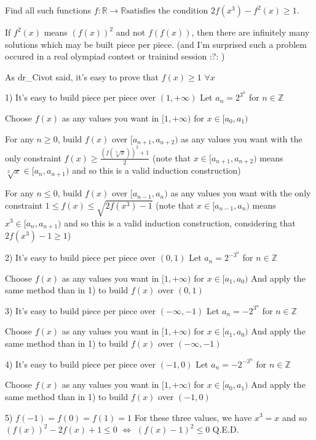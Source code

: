 \begin{solution}
	\begin{tcolorbox}Find all such functions $f:\mathbb{R} \to \mathbb{R} \text{satisfies the condition}$  $2f(x^3)-f^2(x)\geq 1$.\end{tcolorbox}
If $f^2(x)$ means $(f(x))^2$ and not $f(f(x))$, then there are infinitely many solutions which may be built piece per piece.
(and I'm surprised such a problem occured in a real olympiad contest or trainind session :?: )

As dr_Civot said, it's easy to prove that $f(x)\ge 1$ $\forall x$

1) It's easy to build piece per piece over $(1,+\infty)$
Let $a_n=2^{3^n}$ for $n\in\mathbb Z$

Choose $f(x)$ as any values you want in $[1,+\infty)$ for $x\in [a_0,a_1)$

For any $n\ge 0$, build $f(x)$ over $[a_{n+1},a_{n+2})$ as any values you want with the only constraint $f(x)\ge\frac{(f(\sqrt[3]x))^2+1}2$
(note that $x\in[a_{n+1},a_{n+2})$ means $\sqrt[3]x\in[a_{n},a_{n+1})$ and so this is a valid induction construction)

For any $n\le 0$, build $f(x)$ over $[a_{n-1},a_{n})$ as any values you want with the only constraint $1\le f(x)\le\sqrt{2f(x^3)-1}$
(note that $x\in[a_{n-1},a_{n})$ means $x^3\in[a_{n},a_{n+1})$ and so this is a valid induction construction, considering that $2f(x^3)-1\ge 1$)

2) It's easy to build piece per piece over $(0,1)$
Let $a_n=2^{-3^n}$ for $n\in\mathbb Z$

Choose $f(x)$ as any values you want in $[1,+\infty)$ for $x\in [a_1,a_0)$
And apply the same method than in 1) to build $f(x)$ over $(0,1)$

3) It's easy to build piece per piece over $(-\infty,-1)$
Let $a_n=-2^{3^n}$ for $n\in\mathbb Z$

Choose $f(x)$ as any values you want in $[1,+\infty)$ for $x\in [a_1,a_0)$
And apply the same method than in 1) to build $f(x)$ over $(-\infty,-1)$

4) It's easy to build piece per piece over $(-1,0)$
Let $a_n=-2^{-3^n}$ for $n\in\mathbb Z$

Choose $f(x)$ as any values you want in $[1,+\infty)$ for $x\in [a_0,a_1)$
And apply the same method than in 1) to build $f(x)$ over $(-1,0)$

5) $f(-1)=f(0)=f(1)=1$
For these three values, we have $x^3=x$ and so $(f(x))^2-2f(x)+1\le 0$ $\iff$ $(f(x)-1)^2\le 0$
Q.E.D.
\end{solution}



